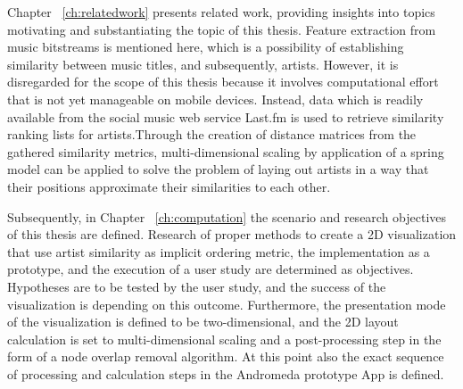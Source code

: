 Chapter ~\ref{ch:relatedwork} presents related work, providing insights into topics motivating and substantiating the topic of this thesis. Feature extraction from music bitstreams is mentioned here, which is a possibility of establishing similarity between music titles, and subsequently, artists. However, it is disregarded for the scope of this thesis because it involves computational effort that is not yet manageable on mobile devices. Instead, data which is readily available from the social music web service Last.fm is used to retrieve similarity ranking lists for artists.Through the creation of distance matrices from the gathered similarity metrics, multi-dimensional scaling by application of a spring model can be applied to solve the problem of laying out artists in a way that their positions approximate their similarities to each other.

Subsequently, in Chapter ~\ref{ch:computation} the scenario and research objectives of this thesis are defined. Research of proper methods to create a 2D visualization that use artist similarity as implicit ordering metric, the implementation as a prototype, and the execution of a user study are determined as objectives. Hypotheses are to be tested by the user study, and the success of the visualization is depending on this outcome. Furthermore, the presentation mode of the visualization is defined to be two-dimensional, and the 2D layout calculation is set to multi-dimensional scaling and a post-processing step in the form of a node overlap removal algorithm. At this point also the exact sequence of processing and calculation steps in the Andromeda prototype App is defined.


